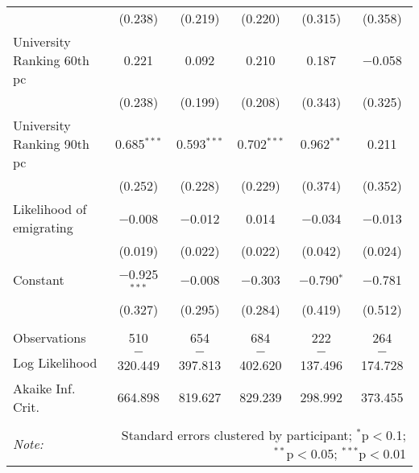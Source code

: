 \documentclass[12pt]{article}
\begin{document}
\begin{appendices}
\begin{landscape}
\begin{table}[!htbp]
\begin{tabular}{@{\extracolsep{5pt}}lccccc}
  & (0.238) & (0.219) & (0.220) & (0.315) & (0.358) \\ 
  University Ranking 60th pc & 0.221 & 0.092 & 0.210 & 0.187 & $-$0.058 \\ 
  & (0.238) & (0.199) & (0.208) & (0.343) & (0.325) \\ 
  University Ranking 90th pc & 0.685$^{***}$ & 0.593$^{***}$ & 0.702$^{***}$ & 0.962$^{**}$ & 0.211 \\ 
  & (0.252) & (0.228) & (0.229) & (0.374) & (0.352) \\ 
  Likelihood of emigrating & $-$0.008 & $-$0.012 & 0.014 & $-$0.034 & $-$0.013 \\ 
  & (0.019) & (0.022) & (0.022) & (0.042) & (0.024) \\ 
  Constant & $-$0.925$^{***}$ & $-$0.008 & $-$0.303 & $-$0.790$^{*}$ & $-$0.781 \\ 
  & (0.327) & (0.295) & (0.284) & (0.419) & (0.512) \\ 
 \hline \\[-1.8ex] 
Observations & 510 & 654 & 684 & 222 & 264 \\ 
Log Likelihood & $-$320.449 & $-$397.813 & $-$402.620 & $-$137.496 & $-$174.728 \\ 
Akaike Inf. Crit. & 664.898 & 819.627 & 829.239 & 298.992 & 373.455 \\ 
\hline 
\hline \\[-1.8ex] 
\textit{Note:}  & \multicolumn{5}{r}{Standard errors clustered by participant; $^{*}$p$<$0.1; $^{**}$p$<$0.05; $^{***}$p$<$0.01} \\ 
\end{tabular} 
\end{table} 
\end{landscape}

\clearpage


\end{appendices}
\end{document}
